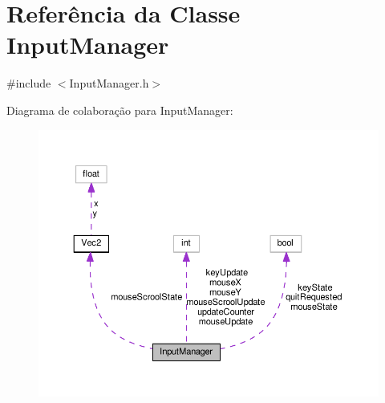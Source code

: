 \hypertarget{classInputManager}{\section{Referência da Classe Input\+Manager}
\label{classInputManager}
}


{\ttfamily \#include $<$Input\+Manager.\+h$>$}



Diagrama de colaboração para Input\+Manager\+:
\nopagebreak
\begin{figure}[H]
\begin{center}
\leavevmode
\includegraphics[width=350pt]{classInputManager__coll__graph}
\end{center}
\end{figure}
